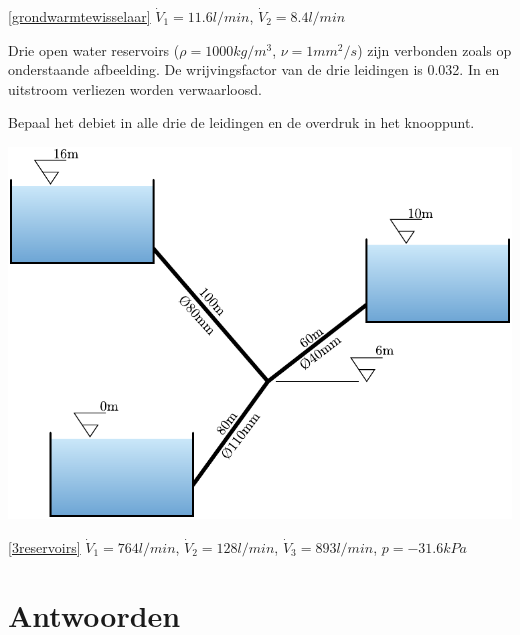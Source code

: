 \begin{antwoord}{\ref{grondwarmtewisselaar}}
	$\dot{V}_{1} = 11.6\unit{l/min}$, $\dot{V}_{2} = 8.4\unit{l/min}$
\end{antwoord}
\begin{toepassing}[*]
	\label{3reservoirs}
Drie open water reservoirs ($\rho=1000\unit{kg/m^3}$, $\nu=1\unit{mm^2/s}$) zijn verbonden zoals op onderstaande afbeelding. De wrijvingsfactor van de drie leidingen is 0.032. In en uitstroom verliezen worden verwaarloosd.
		
Bepaal het debiet in alle drie de leidingen en de overdruk in het knooppunt.
		
	\centering
	\includegraphics{fig/leidingnetwerken/3reservoirs}
\end{toepassing}
\begin{antwoord}{\ref{3reservoirs}}
		$\dot{V}_1 = 764\unit{l/min}$, $\dot{V}_2 = 128\unit{l/min}$, $\dot{V}_3 = 893\unit{l/min}$, $p=-31.6\unit{kPa}$
\end{antwoord}
\section*{Antwoorden}
	\begin{multicols}{2}
	\end{multicols}